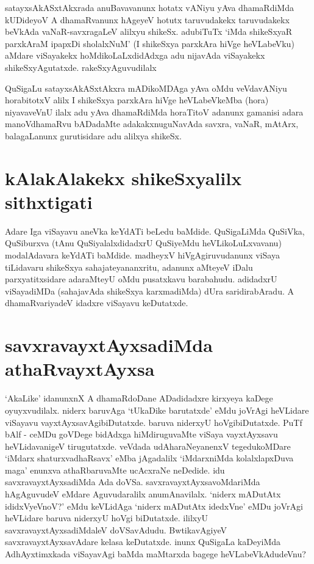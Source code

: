 satayxsAkASxtAkxrada anuBavavanunx  hotatx vANiyu yAva dhamaRdiMda kUDideyoV A dhamaRvanunx hAgeyeV hotutx taruvudakekx taruvudakekx beVkAda vaNaR-savxragaLeV alilxyu shikeSx. adubiTuTx `iMda shikeSxyaR parxkAraM ipapxDi sholalxNuM' (I shikeSxya parxkAra hiVge  heVLabeVku) aMdare viSayakekx  hoMdikoLaLxdidAdxga adu nijavAda viSayakekx shikeSxyAgutatxde. rakeSxyAguvudilalx
 
 QuSigaLu satayxsAkASxtAkxra mADikoMDAga yAva oMdu veVdavANiyu horabitotxV alilx I shikeSxya parxkAra hiVge heVLabeVkeMba (hora) niyavaveVnU ilalx adu yAva dhamaRdiMda horaTitoV adanunx gamanisi adara manoVdhamaRvu bADadaMte adakakxnuguNavAda savxra, vaNaR, mAtArx, balagaLanunx  gurutisidare adu alilxya shikeSx.
 
\section*{kAlakAlakekx  shikeSxyalilx sithxtigati}

Adare Iga viSayavu aneVka keYdATi beLedu baMdide. QuSigaLiMda QuSiVka, QuSiburxva (tAnu QuSiyalalxdidadxrU QuSiyeMdu heVLikoLuLxvavanu) modalAdavara keYdATi baMdide. madheyxV hiVgAgiruvudanunx  viSaya tiLidavaru shikeSxya sahajateyananxritu, adanunx  aMteyeV iDalu parxyatitxsidare adaraMteyU oMdu pusatxkavu barabahudu. adidadxrU  viSayadiMDa (sahajavAda shikeSxya karxmadiMda) dUra saridirabAradu. A dhamaRvariyadeV idadxre viSayavu keDutatxde.

  
\section*{savxravayxtAyxsadiMda  athaRvayxtAyxsa}

`AkaLike' idanunxnX A dhamaRdoDane ADadidadxre kirxyeya kaDege oyuyxvudilalx. niderx baruvAga `tUkaDike barutatxde' eMdu joVrAgi heVLidare viSayavu vayxtAyxsavAgibiDutatxde. baruva niderxyU hoVgibiDutatxde. PuTf bAlf - ceMDu goVDege bidAdxga  hiMdiruguvaMte viSaya vayxtAyxsavu heVLidavanigeV tirugutatxde. veVdada udAharaNeyanenxV tegedukoMDare `iMdarx shaturxvadhaRsavx'\label{9} eMba jAgadalilx `iMdarxniMda kolalxlapxDuva maga' enunxva athaRbaruvaMte ucAcxraNe neDedide. idu savxravayxtAyxsadiMda Ada doVSa. savxravayxtAyxsavoMdariMda hAgAguvudeV eMdare Aguvudaralilx anumAnavilalx. `niderx mADutAtx ididxVyeVnoV?' eMdu keVLidAga `niderx mADutAtx idedxVne' eMDu joVrAgi heVLidare baruva niderxyU hoVgi biDutatxde. ililxyU savxravayxtAyxsadiMdaleV doVSavAdudu. BwtikavAgiyeV savxravayxtAyxsavAdare kelasa keDutatxde. inunx  QuSigaLa kaDeyiMda AdhAyxtimxkada viSayavAgi baMda maMtarxda bagege heVLabeVkAdudeVnu?

